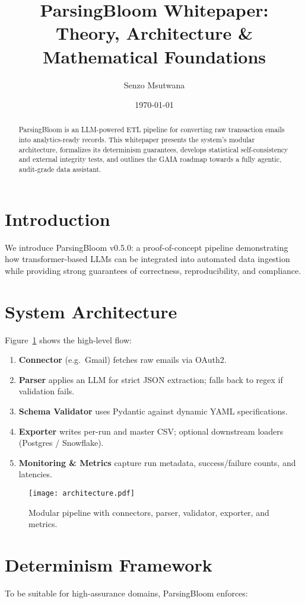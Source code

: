 \documentclass{report}
\title{ParsingBloom Whitepaper:\\Theory, Architecture \& Mathematical Foundations}
\author{Senzo Msutwana}
\date{\today}
\begin{document}
	\maketitle
	
	\begin{abstract}
		ParsingBloom is an LLM-powered ETL pipeline for converting raw transaction emails into analytics-ready records.  
		This whitepaper presents the system’s modular architecture, formalizes its determinism guarantees, develops statistical self-consistency and external integrity tests, and outlines the GAIA roadmap towards a fully agentic, audit-grade data assistant.
	\end{abstract}
	
	\section{Introduction}
	We introduce ParsingBloom v0.5.0: a proof-of-concept pipeline demonstrating how transformer-based LLMs can be integrated into automated data ingestion while providing strong guarantees of correctness, reproducibility, and compliance.
	
	\section{System Architecture}
	Figure~\ref{fig:arch} shows the high-level flow:
	\begin{enumerate}
		\item \textbf{Connector} (e.g.\ Gmail) fetches raw emails via OAuth2.
		\item \textbf{Parser} applies an LLM for strict JSON extraction; falls back to regex if validation fails.
		\item \textbf{Schema Validator} uses Pydantic against dynamic YAML specifications.
		\item \textbf{Exporter} writes per-run and master CSV; optional downstream loaders (Postgres / Snowflake).
		\item \textbf{Monitoring \& Metrics} capture run metadata, success/failure counts, and latencies.
	\end{enumerate}
	\begin{figure}[h]
		\centering
		\texttt{[image: architecture.pdf]}
		\caption{Modular pipeline with connectors, parser, validator, exporter, and metrics.}
		\label{fig:arch}
	\end{figure}
	
	\section{Determinism Framework}
	To be suitable for high-assurance domains, ParsingBloom enforces:
	
\end{document}
